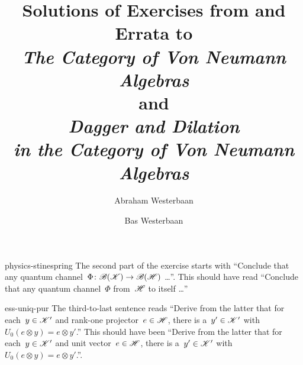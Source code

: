 \documentclass[b5page]{book}
\author{Abraham Westerbaan \and Bas Westerbaan}
\title{
    {\large Solutions of Exercises from and Errata to} \\
    \emph{The Category of Von Neumann Algebras}\\
    {\large and}\\
    \emph{Dagger and Dilation\\ {\large in the Category of Von Neumann Algebras}}}
\begin{document}
\maketitle

\begin{erratum}{physics-stinespring}%
The second part of the exercise starts with
    ``Conclude that any quantum channel~$\Phi\colon \mathscr{B}(\mathscr{K}) \to \mathscr{B}(\mathscr{H})$ \ldots''.
This should have read
    ``Conclude that any quantum channel~$\Phi$ from~$\mathscr{H}$ to itself \ldots''
\end{erratum}

\begin{erratum}{ess-uniq-pur}%
The third-to-last sentence reads
``Derive from the latter
that for each~$y \in \mathscr{K}'$ and rank-one projector~$e \in \mathscr{H}$,
there is a~$y' \in \mathscr{K}'$
with~$U_0 (e \otimes y) = e \otimes y'$.''
This should have been
``Derive from the latter
that for each~$y \in \mathscr{K}'$ and unit vector~$e \in \mathscr{H}$,
there is a~$y' \in \mathscr{K}'$
with~$U_0 (e \otimes y) = e \otimes y'$.''.
\end{erratum}
\end{document}

